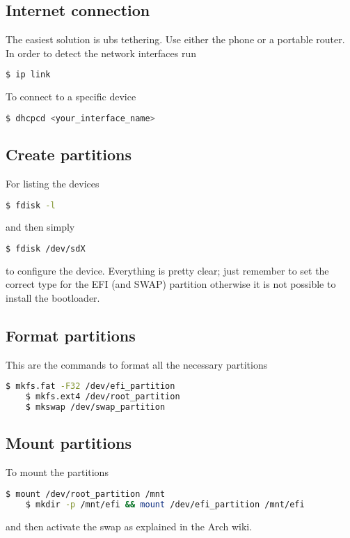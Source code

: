 \documentclass[12pt]{article}
\begin{document}
\subsection*{Internet connection}
The easiest solution is ubs tethering. Use either the phone or a portable router. In order to detect the network interfaces run
\begin{lstlisting}[language=bash]
    $ ip link
\end{lstlisting}
To connect to a specific device
\begin{lstlisting}[language=bash]
    $ dhcpcd <your_interface_name>
\end{lstlisting}

\subsection*{Create partitions}
For listing the devices
\begin{lstlisting}[language=bash]
    $ fdisk -l
\end{lstlisting}
and then simply
\begin{lstlisting}[language=bash]
    $ fdisk /dev/sdX
\end{lstlisting}
to configure the device. Everything is pretty clear; just remember to set the correct type for the EFI (and SWAP) partition otherwise it is not possible to install the bootloader.

\subsection*{Format partitions}
This are the commands to format all the necessary partitions
\begin{lstlisting}[language=bash]
    $ mkfs.fat -F32 /dev/efi_partition
    $ mkfs.ext4 /dev/root_partition
    $ mkswap /dev/swap_partition
\end{lstlisting}

\subsection*{Mount partitions}
To mount the partitions
\begin{lstlisting}[language=bash]
    $ mount /dev/root_partition /mnt
    $ mkdir -p /mnt/efi && mount /dev/efi_partition /mnt/efi
\end{lstlisting}
and then activate the swap as explained in the Arch wiki.
\end{document}

